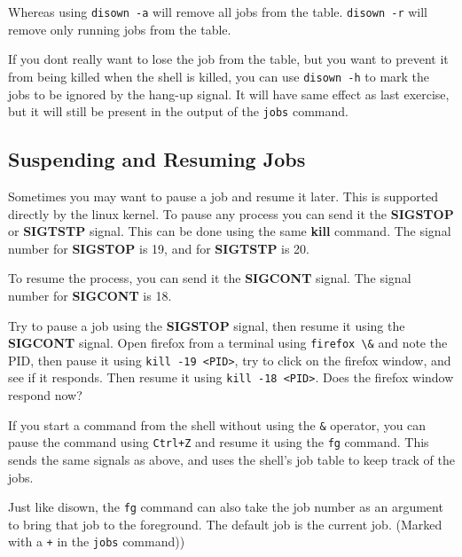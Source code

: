 Whereas using \lstinline|disown -a| will remove all jobs from the table.
\lstinline|disown -r| will remove only running jobs from the table.

If you dont really want to lose the job from the table, but you want to
prevent it from being killed when the shell is killed, you can use
\lstinline|disown -h| to mark the jobs to be ignored by the hang-up signal.
It will have same effect as last exercise, but it will still be present
in the output of the \lstinline|jobs| command.

\subsection{Suspending and Resuming Jobs}

Sometimes you may want to pause a job and resume it later.
This is supported directly by the linux kernel.
To pause any process you can send it the \textbf{SIGSTOP} or \textbf{SIGTSTP} signal.
This can be done using the same \textbf{kill} command. The signal number for
\textbf{SIGSTOP} is 19, and for \textbf{SIGTSTP} is 20.

To resume the process, you can send it the \textbf{SIGCONT} signal.
The signal number for \textbf{SIGCONT} is 18.

\begin{exercise}
  Try to pause a job using the \textbf{SIGSTOP} signal, then resume it using the
  \textbf{SIGCONT} signal.
  Open firefox from a terminal using \lstinline|firefox \&| and note the PID,
  then pause it using
  \lstinline|kill -19 <PID>|,
  try to click on the firefox window, and see if it responds.
  Then resume it using \lstinline|kill -18 <PID>|.
  Does the firefox window respond now?
\end{exercise}

If you start a command from the shell without using the \lstinline|&| operator,
you can pause the command using \lstinline|Ctrl+Z| and resume it using the
\lstinline|fg| command.
This sends the same signals as above, and uses the shell's job table
to keep track of the jobs.

\begin{remark}
  Just like disown, the \lstinline|fg| command can also take the job number
  as an argument to bring that job to the foreground. The default job
  is the current job. (Marked with a \lstinline|+| in the \lstinline|jobs| command))
\end{remark}

